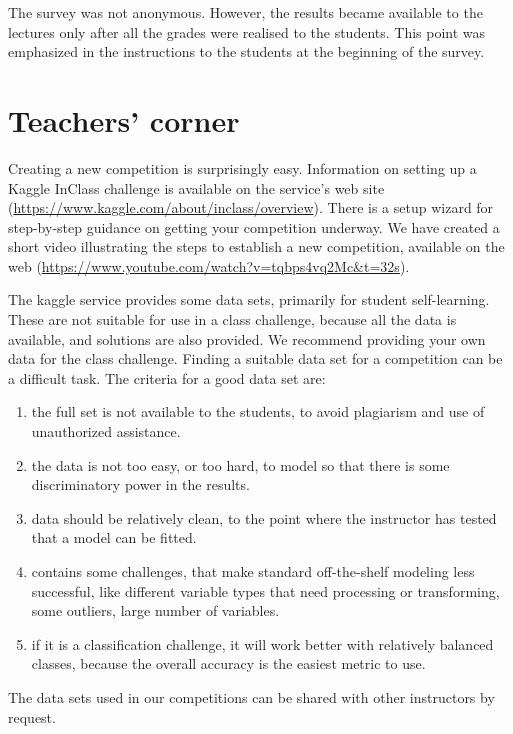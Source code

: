 \documentclass[12pt]{article}
\providecommand{\tightlist}{%
  \setlength{\itemsep}{0pt}\setlength{\parskip}{0pt}}
\begin{document}
The survey was not anonymous. However, the results became available to
the lectures only after all the grades were realised to the students.
This point was emphasized in the instructions to the students at the
beginning of the survey.

\section{Teachers' corner}\label{teachers-corner}

Creating a new competition is surprisingly easy. Information on setting
up a Kaggle InClass challenge is available on the service's web site
(\url{https://www.kaggle.com/about/inclass/overview}). There is a setup
wizard for step-by-step guidance on getting your competition underway.
We have created a short video illustrating the steps to establish a new
competition, available on the web
(\url{https://www.youtube.com/watch?v=tqbps4vq2Mc&t=32s}).

The kaggle service provides some data sets, primarily for student
self-learning. These are not suitable for use in a class challenge,
because all the data is available, and solutions are also provided. We
recommend providing your own data for the class challenge. Finding a
suitable data set for a competition can be a difficult task. The
criteria for a good data set are:

\begin{enumerate}
\def\labelenumi{\arabic{enumi}.}
\tightlist
\item
  the full set is not available to the students, to avoid plagiarism and
  use of unauthorized assistance.
\item
  the data is not too easy, or too hard, to model so that there is some
  discriminatory power in the results.
\item
  data should be relatively clean, to the point where the instructor has
  tested that a model can be fitted.
\item
  contains some challenges, that make standard off-the-shelf modeling
  less successful, like different variable types that need processing or
  transforming, some outliers, large number of variables.
\item
  if it is a classification challenge, it will work better with
  relatively balanced classes, because the overall accuracy is the
  easiest metric to use.
\end{enumerate}

The data sets used in our competitions can be shared with other
instructors by request.
\end{document}
